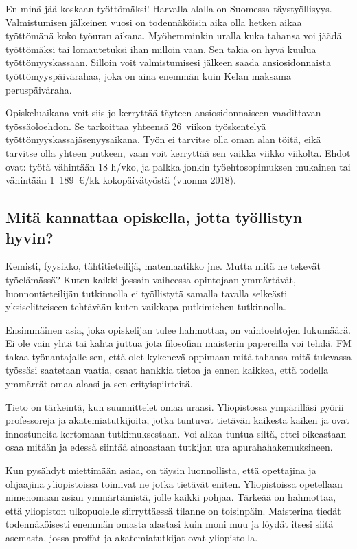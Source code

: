 \documentclass[a5paper, 8pt, twocolumn]{book} %
\numberwithin{equation}{section}
\begin{document}
En minä jää koskaan työttömäksi!
Harvalla alalla on Suomessa täystyöllisyys.
Valmistumisen jälkeinen vuosi on
todennäköisin aika olla hetken aikaa työttömänä
koko työuran aikana. Myöhemminkin
uralla kuka tahansa voi jäädä työttömäksi
tai lomautetuksi ihan milloin vaan.
Sen takia on hyvä kuulua työttömyyskassaan.
Silloin voit valmistumisesi jälkeen
saada ansiosidonnaista työttömyyspäivärahaa,
joka on aina enemmän kuin Kelan
maksama peruspäiväraha.

Opiskeluaikana voit siis jo kerryttää täyteen
ansiosidonnaiseen vaadittavan työssäoloehdon.
Se tarkoittaa yhteensä 26~viikon
työskentelyä työttömyyskassajäsenyysaikana.
Työn ei tarvitse olla oman alan töitä,
eikä tarvitse olla yhteen putkeen, vaan voit
kerryttää sen vaikka viikko viikolta. Ehdot
ovat: työtä vähintään 18 h/vko, ja palkka
jonkin työehtosopimuksen mukainen
tai vähintään 1~189~\euro/kk kokopäivätyöstä
(vuonna 2018).
\subsection*{Mitä kannattaa opiskella, jotta työllistyn hyvin?}
Kemisti, fyysikko, tähtitieteilijä, matemaatikko
jne. Mutta mitä he tekevät työelämässä?
Kuten kaikki jossain vaiheessa
opintojaan ymmärtävät, luonnontieteilijän
tutkinnolla ei työllistytä samalla tavalla
selkeästi yksiselitteiseen tehtävään kuten
vaikkapa putkimiehen tutkinnolla.

Ensimmäinen asia, joka opiskelijan tulee
hahmottaa, on vaihtoehtojen lukumäärä.
Ei ole vain yhtä tai kahta juttua jota filosofian
maisterin papereilla voi tehdä. FM
takaa työnantajalle sen, että olet kykenevä
oppimaan mitä tahansa mitä tulevassa työssäsi
saatetaan vaatia, osaat hankkia tietoa ja
ennen kaikkea, että todella ymmärrät omaa
alaasi ja sen erityispiirteitä.

Tieto on tärkeintä, kun suunnittelet
omaa uraasi. Yliopistossa ympärilläsi pyörii
professoreja ja akatemiatutkijoita, jotka
tuntuvat tietävän kaikesta kaiken ja ovat
innostuneita kertomaan tutkimuksestaan.
Voi alkaa tuntua siltä, ettei oikeastaan osaa
mitään ja edessä siintää ainoastaan tutkijan
ura apurahahakemuksineen.

Kun pysähdyt miettimään asiaa, on täysin
luonnollista, että opettajina ja ohjaajina
yliopistoissa toimivat ne jotka tietävät eniten.
Yliopistoissa opetellaan nimenomaan
asian ymmärtämistä, jolle kaikki pohjaa.
Tärkeää on hahmottaa, että yliopiston ulkopuolelle
siirryttäessä tilanne on toisinpäin.
Maisterina tiedät todennäköisesti enemmän
omasta alastasi kuin moni muu ja löydät itsesi
siitä asemasta, jossa proffat ja akatemiatutkijat
ovat yliopistolla.
\end{document}
